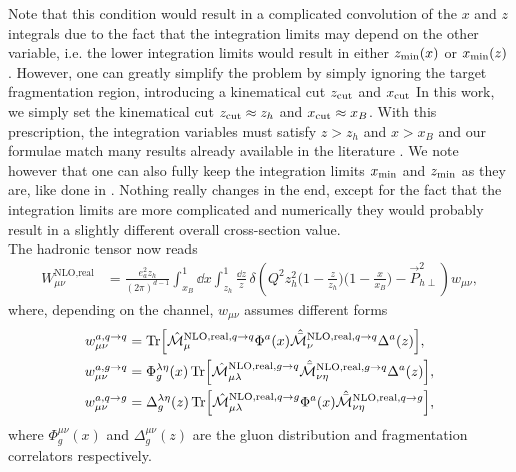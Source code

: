 Note that this condition would result in a complicated convolution of the $x$ and $z$ integrals due to the fact that the integration limits may depend on the other variable, i.e. the lower integration limits would result in either $z_{\rm min}(x)$ or $x_{\rm min}(z)$. However, one can greatly simplify the problem by simply ignoring the target fragmentation region, introducing a kinematical cut $z_{\rm cut}$ and $x_{\rm cut}$ \cite{Sissakian_2004} In this work, we simply set the kinematical cut $z_{\rm cut}\approx z_h$ and $x_{\rm cut}\approx x_B$. With this prescription, the integration variables must satisfy $z>z_h$ and $x>x_B$ and our formulae match many results already available in the literature \cite{de_Florian_1998,Koike_2006}. We note however that one can also fully keep the integration limits $x_{\rm min}$ and $z_{\rm min}$ as they are, like done in \cite{kanazawa_contribution_2013}. Nothing really changes in the end, except for the fact that the integration limits are more complicated and numerically they would probably result in a slightly different overall cross-section value. \\
The hadronic tensor now reads
\begin{equation}
\begin{aligned}
      W_{\mu\nu}^{\text{NLO,real}}&=\frac{e_a^2z_h}{(2\pi)^{d-1}} \int_{x_B}^{1} \dd x\int_{z_h}^{1}  \frac{\dd z}{z}\,\delta\left(Q^2z_h^2\Big(1-\frac{z}{z_h} \Big)\Big(1-\frac{x}{x_B}\Big) - \vec P_{h\perp}^2\right)w_{\mu\nu},
\end{aligned}
\end{equation}
where, depending on the channel, $w_{\mu\nu}$ assumes different forms
\begin{equation}
    \begin{aligned}
        w_{\mu\nu}^{a,q \to q}&=\Tr[\hat{\mathcal{M}}_\mu^{\text{NLO,real},q \to q}\Phi^a(x)\hat{\bar{\mathcal{M}}}_\nu^{\text{NLO,real},q \to q}\Delta^a(z)],\\
        w_{\mu\nu}^{a,g \to q}&=\Phi_g^{\lambda\eta}(x)\Tr[\hat{\mathcal{M}}_{\mu\lambda}^{\text{NLO,real},g \to q}\hat{\bar{\mathcal{M}}}_{\nu\eta}^{\text{NLO,real},g \to q}\Delta^a(z)],\\
        w_{\mu\nu}^{a,q \to g}&=\Delta_g^{\lambda\eta}(z)\Tr[\hat{\mathcal{M}}_{\mu\lambda}^{\text{NLO,real},q \to g}\Phi^a(x)\hat{\bar{\mathcal{M}}}_{\nu\eta}^{\text{NLO,real},q \to g}],
    \end{aligned}
\end{equation}
where $\Phi^{\mu\nu}_g(x)$ and $\Delta_g^{\mu\nu}(z)$ are the gluon distribution and fragmentation correlators respectively. 
